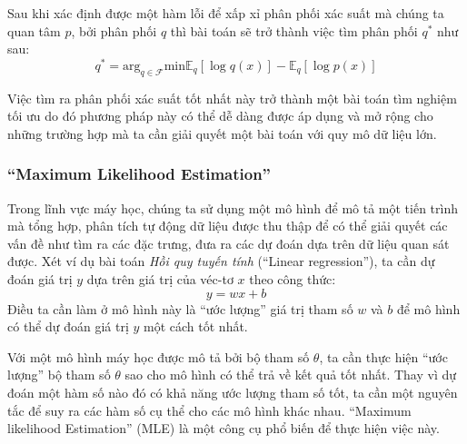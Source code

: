         Sau khi xác định được một hàm lỗi để xấp xỉ phân phối xác suất mà chúng ta quan tâm $p$,  bởi phân phối $q$ thì bài toán sẽ trở thành việc tìm phân phối $q^*$ như sau:
        $$q^* = \text{arg}_{q\in\mathcal{F}} \text{min}\mathbb{E}_q[\log q(x)] - \mathbb{E}_q[\log p(x)] $$

        Việc tìm ra phân phối xác suất tốt nhất này trở thành một bài toán tìm nghiệm tối ưu do đó phương pháp này  có thể dễ dàng được áp dụng và mở rộng cho những trường hợp mà ta cần giải quyết một bài toán với quy mô dữ liệu lớn. 
        
        
            

        \subsubsection{ ``Maximum Likelihood Estimation''}

        Trong lĩnh vực máy học, chúng ta sử dụng một mô hình để mô tả một tiến trình mà tổng hợp,
        phân tích tự động dữ liệu được thu thập để có thể giải quyết các vấn đề như tìm ra các đặc trưng,
        đưa ra các dự đoán dựa trên dữ liệu quan sát được.
        Xét ví dụ bài toán \textit{Hồi quy tuyến tính} (``Linear regression''),
        ta cần dự đoán giá trị $y$ dựa trên giá trị của véc-tơ $x$ theo công thức:
        \begin{equation}
        \label{equal_LR}
            y = wx + b
        \end{equation}
        Điều ta cần làm ở mô hình này là ``ước lượng'' giá trị tham số $w$ và $b$
        để mô hình có thể dự đoán giá trị $y$ một cách tốt nhất. 
        
        Với một mô hình máy học được mô tả bởi bộ tham số $\theta$, ta cần thực hiện ``ước lượng''
        bộ tham số $\theta$ sao cho mô hình có thể trả về kết quả tốt nhất. 
        Thay vì dự đoán một hàm số nào đó có khả năng ước lượng tham số tốt, ta cần một nguyên tắc để suy ra các hàm số cụ thể 
        cho các mô hình khác nhau.
        ``Maximum likelihood Estimation'' (MLE) là một công cụ phổ biến để thực hiện việc này.
        
